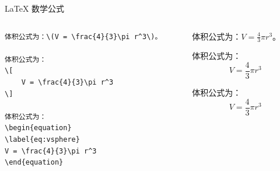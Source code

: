 \begin{frame}[fragile]{\LaTeX{} 数学公式}

    \begin{columns}
        \begin{column}{.5\textwidth}
            \lstset{language=[LaTeX]TeX}
            \begin{lstlisting}[basicstyle=\ttfamily\small]
体积公式为：\(V = \frac{4}{3}\pi r^3\)。

体积公式为：
\[
    V = \frac{4}{3}\pi r^3
\]

体积公式为：
\begin{equation}
\label{eq:vsphere}
V = \frac{4}{3}\pi r^3
\end{equation}\end{lstlisting}
        \end{column}
        \begin{column}{.5\textwidth}
            体积公式为：\(V = \frac{4}{3}\pi r^3\)。

            体积公式为：
            \[
                V = \frac{4}{3}\pi r^3
            \]

            体积公式为：
            \begin{equation}
                \label{eq:vsphere}
                V = \frac{4}{3}\pi r^3
            \end{equation}
        \end{column}
    \end{columns}

\end{frame}


